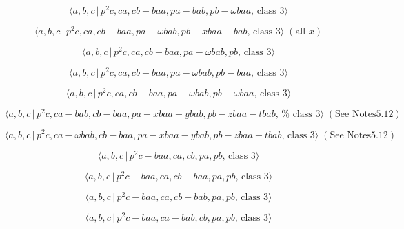 \documentclass[10pt]{article}
\begin{document}
\begin{equation}
\langle a,b,c\,|\,p^{2}c,ca,cb-baa,pa-bab,pb-\omega baa,\,\text{class }%
3\rangle  \tag{7.724}
\end{equation}

\begin{equation}
\langle a,b,c\,|\,p^{2}c,ca,cb-baa,pa-\omega bab,pb-xbaa-bab,\,\text{class }%
3\rangle \;(\text{all }x)  \tag{7.725}
\end{equation}

\begin{equation}
\langle a,b,c\,|\,p^{2}c,ca,cb-baa,pa-\omega bab,pb,\,\text{class }3\rangle 
\tag{7.726}
\end{equation}

\begin{equation}
\langle a,b,c\,|\,p^{2}c,ca,cb-baa,pa-\omega bab,pb-baa,\,\text{class }%
3\rangle  \tag{7.727}
\end{equation}

\begin{equation}
\langle a,b,c\,|\,p^{2}c,ca,cb-baa,pa-\omega bab,pb-\omega baa,\,\text{class 
}3\rangle  \tag{7.728}
\end{equation}

\begin{equation}
\langle a,b,c\,|\,p^{2}c,ca-bab,cb-baa,pa-xbaa-ybab,pb-zbaa-tbab,\,\text{%
class }3\rangle \;(\text{See Notes5.12})  \tag{7.729}
\end{equation}

\begin{equation}
\langle a,b,c\,|\,p^{2}c,ca-\omega bab,cb-baa,pa-xbaa-ybab,pb-zbaa-tbab,\,%
\text{class }3\rangle \;(\text{See Notes5.12})  \tag{7.730}
\end{equation}

\begin{equation}
\langle a,b,c\,|\,p^2c-baa,ca,cb,pa,pb,\,\text{class }3\rangle  \tag{7.731}
\end{equation}

\begin{equation}
\langle a,b,c\,|\,p^2c-baa,ca,cb-baa,pa,pb,\,\text{class }3\rangle 
\tag{7.732}
\end{equation}

\begin{equation}
\langle a,b,c\,|\,p^2c-baa,ca,cb-bab,pa,pb,\,\text{class }3\rangle 
\tag{7.733}
\end{equation}

\begin{equation}
\langle a,b,c\,|\,p^2c-baa,ca-bab,cb,pa,pb,\,\text{class }3\rangle 
\tag{7.734}
\end{equation}
\end{document}

